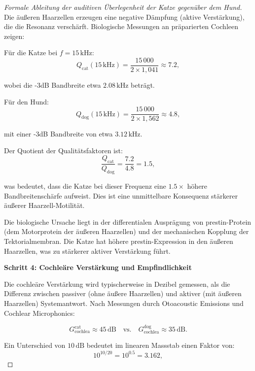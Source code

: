 ﻿\documentclass[12pt, a4paper]{article}
\theoremstyle{definition}
\theoremstyle{remark}
\begin{document}
\begin{proof}[Formale Ableitung der auditiven Überlegenheit der Katze gegenüber dem Hund]
Die äußeren Haarzellen erzeugen eine negative Dämpfung (aktive Verstärkung), die die Resonanz verschärft. Biologische Messungen an präparierten Cochleen zeigen:

Für die Katze bei $f = 15\,\mathrm{kHz}$:
\begin{equation}
Q_{\mathrm{cat}}(15\,\mathrm{kHz}) = \frac{15\,000}{2 \times 1,041} \approx 7.2,
\label{eq:q_cat_calculation}
\end{equation}

wobei die -3dB Bandbreite etwa $2.08\,\mathrm{kHz}$ beträgt.

Für den Hund:
\begin{equation}
Q_{\mathrm{dog}}(15\,\mathrm{kHz}) = \frac{15\,000}{2 \times 1,562} \approx 4.8,
\label{eq:q_dog_calculation}
\end{equation}

mit einer -3dB Bandbreite von etwa $3.12\,\mathrm{kHz}$.

Der Quotient der Qualitätsfaktoren ist:
\begin{equation}
\frac{Q_{\mathrm{cat}}}{Q_{\mathrm{dog}}} = \frac{7.2}{4.8} = 1.5,
\label{eq:q_ratio_derived}
\end{equation}

was bedeutet, dass die Katze bei dieser Frequenz eine $1.5\times$ höhere Bandbreitenschärfe aufweist. Dies ist eine unmittelbare Konsequenz stärkerer äußerer Haarzell-Motilität.

Die biologische Ursache liegt in der differentialen Ausprägung von prestin-Protein (dem Motorprotein der äußeren Haarzellen) und der mechanischen Kopplung der Tektorialmembran. Die Katze hat höhere prestin-Expression in den äußeren Haarzellen, was zu stärkerer aktiver Verstärkung führt.

\textbf{Schritt 4: Cochleäre Verstärkung und Empfindlichkeit}

Die cochleäre Verstärkung wird typischerweise in Dezibel gemessen, als die Differenz zwischen passiver (ohne äußere Haarzellen) und aktiver (mit äußeren Haarzellen) Systemantwort. Nach Messungen durch Otoacoustic Emissions und Cochlear Microphonics:

\begin{equation}
G_{\text{cochlea}}^{\mathrm{cat}} \approx 45\,\mathrm{dB} \quad \text{vs.} \quad G_{\text{cochlea}}^{\mathrm{dog}} \approx 35\,\mathrm{dB}.
\label{eq:cochlear_gain_values}
\end{equation}

Ein Unterschied von $10\,\mathrm{dB}$ bedeutet im linearen Massstab einen Faktor von:
\begin{equation}
10^{10/20} = 10^{0.5} = 3.162,
\label{eq:db_to_linear_conversion}
\end{equation}


\end{proof}
\end{document}
